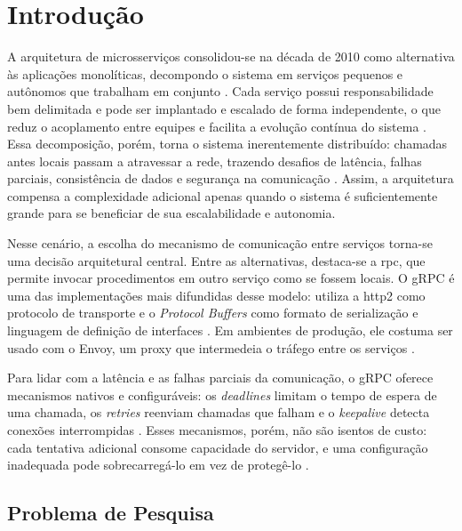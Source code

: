 \chapter{Introdução}\label{cap:introducao}

A arquitetura de microsserviços consolidou-se na década de 2010 como alternativa às aplicações
monolíticas, decompondo o sistema em serviços pequenos e autônomos que trabalham em conjunto
\cite{BuildingMicroservices:2015}. Cada serviço possui responsabilidade bem delimitada e pode ser
implantado e escalado de forma independente, o que reduz o acoplamento entre equipes e facilita a
evolução contínua do sistema \cite{MicroserviceArchitecture:2016}. Essa decomposição, porém, torna
o sistema inerentemente distribuído: chamadas antes locais passam a atravessar a rede, trazendo
desafios de latência, falhas parciais, consistência de dados e segurança na comunicação
\cite{BuildingMicroservices:2015}. Assim, a arquitetura compensa a complexidade adicional apenas
quando o sistema é suficientemente grande para se beneficiar de sua escalabilidade e autonomia.

Nesse cenário, a escolha do mecanismo de comunicação entre serviços torna-se uma decisão
arquitetural central. Entre as alternativas, destaca-se a \gls{rpc}, que permite invocar procedimentos em
outro serviço como se fossem locais. O gRPC é uma das implementações mais difundidas desse modelo:
utiliza a \gls{http2} como protocolo de transporte e o \textit{Protocol Buffers} como formato de
serialização e linguagem de definição de interfaces \cite{gRPC-Introduction:2026}. Em ambientes de
produção, ele costuma ser usado com o Envoy, um proxy que intermedeia o tráfego entre os serviços
\cite{Envoy-Documentation:2026}.

Para lidar com a latência e as falhas parciais da comunicação, o gRPC oferece mecanismos nativos e
configuráveis: os \textit{deadlines} limitam o tempo de espera de uma chamada, os \textit{retries}
reenviam chamadas que falham e o \textit{keepalive} detecta conexões interrompidas
\cite{gRPC-Documentation:2026}. Esses mecanismos,
porém, não são isentos de custo: cada tentativa adicional consome capacidade do servidor, e uma
configuração inadequada pode sobrecarregá-lo em vez de protegê-lo \cite{gRFC-A6:2024}.

\section{Problema de Pesquisa}

